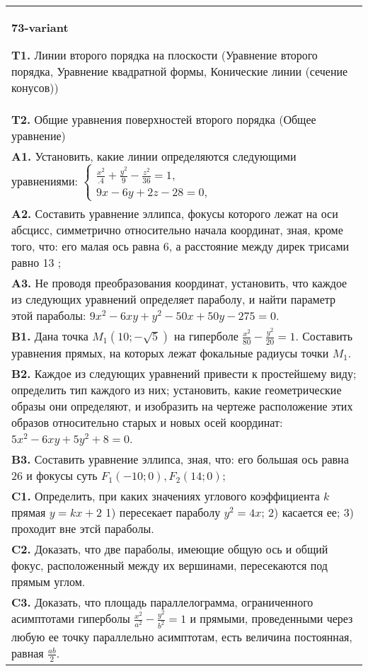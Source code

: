 \documentclass{article}
\begin{document}
\begin{tabular}{m{17cm}}
\textbf{73-variant}
\newline

\textbf{T1.} Линии второго порядка на плоскости (Уравнение второго порядка, Уравнение квадратной формы, Конические линии (сечение конусов)) \\
\textbf{T2.} Общие уравнения поверхностей второго порядка (Общее уравнение) \\
\textbf{A1.} Установить, какие линии определяются следующими уравнениями: $\left\{\begin{array}{l}\frac{x^2}{.4}+\frac{y^2}{9}-\frac{z^2}{36}=1, \\ 9 x-6 y+2 z-28=0,\end{array}\right.$ \\
\textbf{A2.} Составить уравнение эллипса, фокусы которого лежат на оси абсцисс, симметрично относительно начала координат, зная, кроме того, что: его малая ось равна 6, а расстояние между дирек трисами равно 13 ; \\
\textbf{A3.} Не проводя преобразования координат, установить, что каждое из следующих уравнений определяет параболу, и найти параметр этой параболы: $9 x^2-6 x y+y^2-50 x+50 y-275=0$. \\
\textbf{B1.} Дана точка $M_1(10 ;-\sqrt{5})$ на гиперболе $\frac{x^2}{80}-\frac{y^2}{20}=1$. Составить уравнения прямых, на которых лежат фокальные радиусы точки $M_1$. \\
\textbf{B2.} Каждое из следующих уравнений привести к простейшему виду; определить тип каждого из них; установить, какие геометрические образы они определяют, и изобразить на чертеже расположение этих образов относительно старых и новых осей координат: $5 x^2-6 x y+5 y^2+8=0$. \\
\textbf{B3.} Составить уравнение эллипса, зная, что: его большая ось равна 26 и фокусы суть $F_1(-10 ; 0), F_2(14 ; 0)$; \\
\textbf{C1.} Определить, при каких значениях углового коэффициента $k$ прямая $y=k x+2$ 1) пересекает параболу $y^2=4 x$; 2) касается ее; 3) проходит вне этсй параболы. \\
\textbf{C2.} Доказать, что две параболы, имеющие общую ось и общий фокус, расположенный между их вершинами, пересекаются под прямым углом. \\
\textbf{C3.} Доказать, что площадь параллелограмма, ограниченного асимптотами гиперболы $\frac{x^2}{a^2}-\frac{y^2}{b^2}=1$ и прямыми, проведенными через любую ее точку параллельно асимптотам, есть величина постоянная, равная $\frac{a b}{2}$. \\

\end{tabular}
\vspace{1cm}
\end{document}
